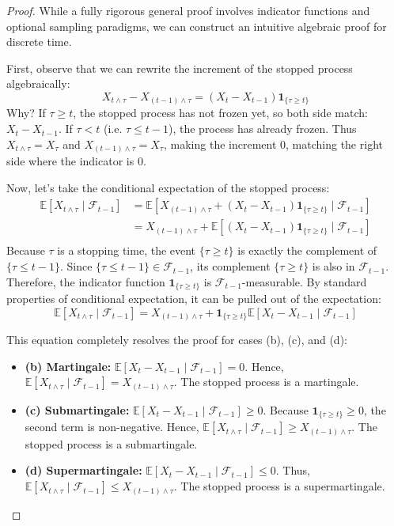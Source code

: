 \begin{proof}
While a fully rigorous general proof involves indicator functions and optional sampling paradigms, we can construct an intuitive algebraic proof for discrete time.

First, observe that we can rewrite the increment of the stopped process algebraically:
$$ X_{t \wedge \tau} - X_{(t-1) \wedge \tau} = (X_t - X_{t-1}) \mathbf{1}_{\{\tau \geq t\}} $$
Why? If $\tau \geq t$, the stopped process has not frozen yet, so both side match: $X_t - X_{t-1}$. 
If $\tau < t$ (i.e. $\tau \leq t-1$), the process has already frozen. Thus $X_{t \wedge \tau} = X_{\tau}$ and $X_{(t-1) \wedge \tau} = X_\tau$, making the increment $0$, matching the right side where the indicator is $0$.

Now, let's take the conditional expectation of the stopped process:
\begin{align*}
\mathbb{E}\left[ X_{t \wedge \tau} \mid \mathcal{F}_{t-1} \right] &= \mathbb{E}\left[ X_{(t-1) \wedge \tau} + (X_t - X_{t-1}) \mathbf{1}_{\{\tau \geq t\}} \mid \mathcal{F}_{t-1} \right] \\
&= X_{(t-1) \wedge \tau} + \mathbb{E}\left[ (X_t - X_{t-1}) \mathbf{1}_{\{\tau \geq t\}} \mid \mathcal{F}_{t-1} \right] \\
\end{align*}
Because $\tau$ is a stopping time, the event $\{\tau \geq t\}$ is exactly the complement of $\{\tau \leq t-1\}$. Since $\{\tau \leq t-1\} \in \mathcal{F}_{t-1}$, its complement $\{\tau \geq t\}$ is also in $\mathcal{F}_{t-1}$. 
Therefore, the indicator function $\mathbf{1}_{\{\tau \geq t\}}$ is $\mathcal{F}_{t-1}$-measurable. By standard properties of conditional expectation, it can be pulled out of the expectation:
$$
\mathbb{E}\left[ X_{t \wedge \tau} \mid \mathcal{F}_{t-1} \right] = X_{(t-1) \wedge \tau} + \mathbf{1}_{\{\tau \geq t\}} \mathbb{E}\left[ X_t - X_{t-1} \mid \mathcal{F}_{t-1} \right]
$$

This equation completely resolves the proof for cases (b), (c), and (d):
\begin{itemize}
    \item \textbf{(b) Martingale:} $\mathbb{E}[X_t - X_{t-1} \mid \mathcal{F}_{t-1}] = 0$. Hence, $\mathbb{E}[X_{t \wedge \tau} \mid \mathcal{F}_{t-1}] = X_{(t-1) \wedge \tau}$. The stopped process is a martingale.
    \item \textbf{(c) Submartingale:} $\mathbb{E}[X_t - X_{t-1} \mid \mathcal{F}_{t-1}] \geq 0$. Because $\mathbf{1}_{\{\tau \geq t\}} \geq 0$, the second term is non-negative. Hence, $\mathbb{E}[X_{t \wedge \tau} \mid \mathcal{F}_{t-1}] \geq X_{(t-1) \wedge \tau}$. The stopped process is a submartingale.
    \item \textbf{(d) Supermartingale:} $\mathbb{E}[X_t - X_{t-1} \mid \mathcal{F}_{t-1}] \leq 0$. Thus, $\mathbb{E}[X_{t \wedge \tau} \mid \mathcal{F}_{t-1}] \leq X_{(t-1) \wedge \tau}$. The stopped process is a supermartingale.
\end{itemize}
\end{proof}
